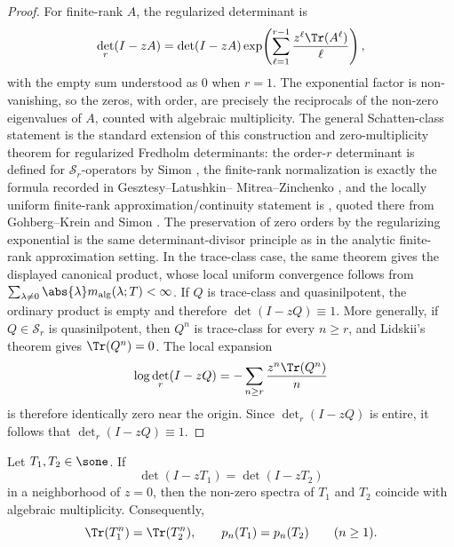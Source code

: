 \begin{proof}
  For finite-rank \(A\), the regularized determinant is
  \[
    \det_r(I-zA)
    =\det(I-zA)
      \exp\!\left(\sum_{\ell=1}^{r-1}
        \frac{z^\ell\Tr(A^\ell)}{\ell}\right),
  \]
  with the empty sum understood as \(0\) when \(r=1\). The exponential
  factor is non-vanishing, so the zeros, with order, are precisely the
  reciprocals of the non-zero eigenvalues of \(A\), counted with algebraic
  multiplicity. The general Schatten-class statement is the standard
  extension of this construction and zero-multiplicity theorem for
  regularized Fredholm determinants: the order-\(r\) determinant is defined
  for \(\mathcal S_r\)-operators by Simon
  \cite[Chapter~9, especially the determinant construction and continuity
  estimates around Theorems~9.2--9.3]{Simon2005TraceIdeals}, the finite-rank
  normalization is exactly the formula recorded in Gesztesy--Latushkin--
  Mitrea--Zinchenko \cite[eq.~(2.80), pp.~462--463]{GesztesyLatushkinMitreaZinchenko2005},
  and the locally uniform finite-rank approximation/continuity statement is
  \cite[Lemma~2.14, eqs.~(2.77)--(2.79), p.~462]{GesztesyLatushkinMitreaZinchenko2005},
  quoted there from Gohberg--Krein
  \cite[pp.~162--163]{GohbergKrein1969NonSelfAdjoint} and Simon
  \cite[Chapter~9]{Simon2005TraceIdeals}. The preservation of zero orders by
  the regularizing exponential is the same determinant-divisor principle as
  \cite[Lemma~2.15, eq.~(2.85), p.~463]{GesztesyLatushkinMitreaZinchenko2005}
  in the analytic finite-rank approximation setting. In the trace-class case,
  the same theorem gives the displayed canonical product, whose local
  uniform convergence follows from
  \(\sum_{
    \lambda\ne0}\abs{\lambda}m_{\mathrm{alg}}(\lambda;T)<\infty\).
  If \(Q\) is trace-class and quasinilpotent, the ordinary product is
  empty and therefore \(\det(I-zQ)\equiv1\). More generally, if
  \(Q\in\mathcal S_r\) is quasinilpotent, then \(Q^n\) is trace-class for
  every \(n\ge r\), and Lidskii's theorem gives \(\Tr(Q^n)=0\). The local
  expansion
  \[
    \log\det_r(I-zQ)=-\sum_{n\ge r}\frac{z^n\Tr(Q^n)}{n}
  \]
  is therefore identically zero near the origin. Since
  \(\det_r(I-zQ)\) is entire, it follows that \(\det_r(I-zQ)\equiv1\).
\end{proof}

\begin{lemma}
  \label{lem:fredholm-spectral-rigidity}
  Let \(T_1,T_2\in \sone\). If
  \[
    \det(I-zT_1)=\det(I-zT_2)
  \]
  in a neighborhood of \(z=0\), then the non-zero spectra of \(T_1\)
  and \(T_2\) coincide with algebraic multiplicity. Consequently,
  \[
    \Tr(T_1^n)=\Tr(T_2^n),
    \qquad
    p_n(T_1)=p_n(T_2)
    \qquad (n\ge 1).
  \]
\end{lemma}

